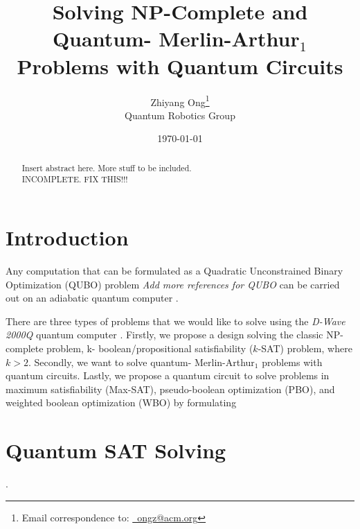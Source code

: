 \documentclass[letter,12pt]{article}
\begin{document}
\title{Solving NP-Complete and Quantum- Merlin-Arthur$_{1}$ Problems with Quantum Circuits}
\date{\today}
\author{Zhiyang Ong\thanks{Email correspondence to: \href{mailto:ongz@acm.org}{\Email\ ongz@acm.org}}\\
	Quantum Robotics Group
}
\maketitle


\begin{abstract} 
Insert abstract here. More stuff to be included. \\

{\Huge INCOMPLETE. FIX THIS!!!}
\end{abstract}




\section{Introduction}
\label{sec:Introduction}

Any computation that can be formulated as a Quadratic Unconstrained Binary Optimization (QUBO) problem \cite{Anjos2012} {\it \Huge Add more references for QUBO} can be carried out on an adiabatic quantum computer \cite{Tandon2017}.

There are three types of problems that we would like to solve using the {\it D-Wave 2000Q} quantum computer \cite{UniversitiesSpaceResearchAssociationStaff2017}. Firstly, we propose a design solving the classic NP-complete problem, k- boolean/propositional satisfiability ($k$-SAT) problem, where $k > 2$. Secondly, we want to solve quantum- Merlin-Arthur$_{1}$ problems with quantum circuits. Lastly, we propose a quantum circuit to solve problems in maximum satisfiability (Max-SAT), pseudo-boolean optimization (PBO), and weighted boolean optimization (WBO) by formulating 


\section{Quantum SAT Solving }
\label{sec:mysection1}

 \cite{Anjos2012}.



















%
%
%

{\linespread{1}


}
\end{document}
